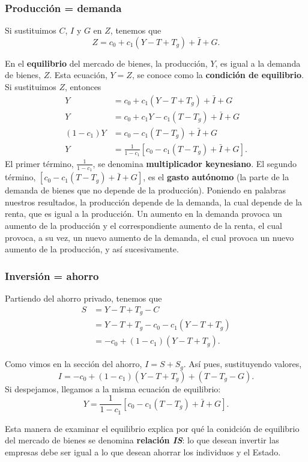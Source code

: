 \documentclass[10pt]{article}
\begin{document}
\begin{multicols*}{2}
\subsubsection{Producción = demanda}

Si sustituimos $C$, $I$ y $G$ en $Z$, tenemos que
\[ Z = c_0 + c_1(Y-T+T_g) + \bar{I} + G.  \]

En el \textbf{equilibrio} del mercado de bienes, la producción, $Y$, es igual a la demanda de bienes, $Z$. Esta ecuación, $Y=Z$, se conoce como la \textbf{condición de equilibrio}. Si sustituimos $Z$, entonces
\begin{align*}
    Y &= c_0 + c_1(Y-T+T_g) + \bar{I} + G \\
    Y &= c_0 + c_1Y - c_1(T-T_g) + \bar{I} + G \\
    (1-c_1)Y &= c_0 - c_1(T-T_g) + \bar{I} + G \\
    Y &= \frac{1}{1-c_1} \left[ c_0 - c_1(T-T_g) + \bar{I} + G \right].
\end{align*}
El primer término, $\frac{1}{1-c_1}$, se denomina \textbf{multiplicador keynesiano}. El segundo término, $\left[ c_0 - c_1(T-T_g) + \bar{I} + G \right]$, es el \textbf{gasto autónomo} (la parte de la demanda de bienes que no depende de la producción). Poniendo en palabras nuestros resultados, la producción depende de la demanda, la cual depende de la renta, que es igual a la producción. Un aumento en la demanda provoca un aumento de la producción y el correspondiente aumento de la renta, el cual provoca, a su vez, un nuevo aumento de la demanda, el cual provoca un nuevo aumento de la producción, y así sucesivamente.

\subsubsection{Inversión = ahorro}
Partiendo del ahorro privado, tenemos que
\begin{align*}
    S &= Y - T + T_g - C \\
      &= Y - T + T_g - c_0 - c_1(Y-T+T_g) \\
      &= -c_0 + (1 - c_1)(Y-T+T_g).      
\end{align*}

Como vimos en la sección del ahorro, $I = S + S_g$. Así pues, sustituyendo valores,
\[ I = -c_0 + (1 - c_1)(Y-T+T_g) + (T-T_g - G). \]
Si despejamos, llegamos a la misma ecuación de equilibrio:
\[ Y = \frac{1}{1-c_1} \left[ c_0 - c_1(T-T_g) + \bar{I} + G \right]. \]

Esta manera de examinar el equilibrio explica por qué la conidción de equilibrio del mercado de bienes se denomina \textbf{relación \textit{IS}}: lo que desean invertir las empresas debe ser igual a lo que desean ahorrar los individuos y el Estado.


\end{multicols*}
\end{document}
